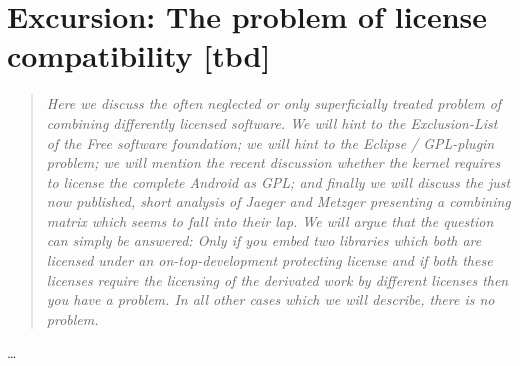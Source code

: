 %
%
%
%
%



\section{Excursion: The problem of license compatibility [tbd]}
\footnotesize
\begin{quote}\itshape
Here we discuss the often neglected or only superficially treated problem of combining
differently licensed software. We will hint to the Exclusion-List of the Free
software foundation; we will hint to the Eclipse / GPL-plugin problem; we will
mention the recent discussion whether the kernel requires to license the
complete Android as GPL; and finally we will discuss the just now published, short
analysis of Jaeger and Metzger presenting a combining matrix which seems to fall
into their lap. %
We will argue that the question can simply be answered:
Only if you embed two libraries which both are licensed under an
on-top-development protecting license and if both these licenses require the
licensing of the derivated work by different licenses then you have a problem.
In all other cases which we will describe, there is no problem.
\end{quote}
\normalsize
\ldots

%

